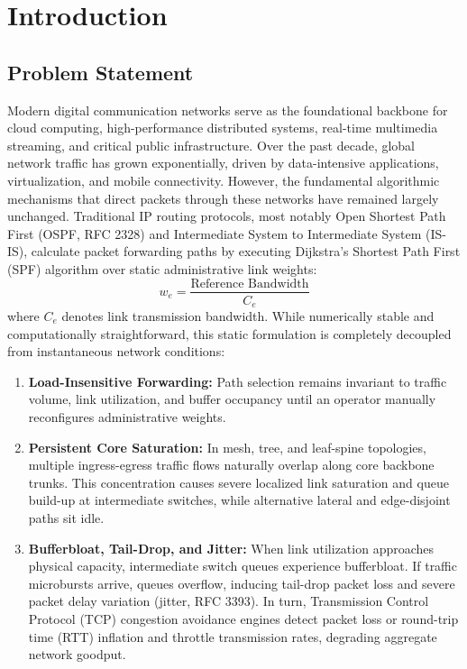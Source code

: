 \documentclass[12pt,a4paper,oneside]{report}
\begin{document}
\chapter{Introduction}
\label{chap:intro}

\section{Problem Statement}
Modern digital communication networks serve as the foundational backbone for cloud computing, high-performance distributed systems, real-time multimedia streaming, and critical public infrastructure. Over the past decade, global network traffic has grown exponentially, driven by data-intensive applications, virtualization, and mobile connectivity. However, the fundamental algorithmic mechanisms that direct packets through these networks have remained largely unchanged. Traditional IP routing protocols, most notably Open Shortest Path First (OSPF, RFC 2328) and Intermediate System to Intermediate System (IS-IS), calculate packet forwarding paths by executing Dijkstra's Shortest Path First (SPF) algorithm over static administrative link weights:
\begin{equation}
w_e = \frac{\text{Reference Bandwidth}}{C_e}
\end{equation}
where $C_e$ denotes link transmission bandwidth. While numerically stable and computationally straightforward, this static formulation is completely decoupled from instantaneous network conditions:
\begin{enumerate}
    \item \textbf{Load-Insensitive Forwarding:} Path selection remains invariant to traffic volume, link utilization, and buffer occupancy until an operator manually reconfigures administrative weights.
    \item \textbf{Persistent Core Saturation:} In mesh, tree, and leaf-spine topologies, multiple ingress-egress traffic flows naturally overlap along core backbone trunks. This concentration causes severe localized link saturation and queue build-up at intermediate switches, while alternative lateral and edge-disjoint paths sit idle.
    \item \textbf{Bufferbloat, Tail-Drop, and Jitter:} When link utilization approaches physical capacity, intermediate switch queues experience bufferbloat. If traffic microbursts arrive, queues overflow, inducing tail-drop packet loss and severe packet delay variation (jitter, RFC 3393). In turn, Transmission Control Protocol (TCP) congestion avoidance engines detect packet loss or round-trip time (RTT) inflation and throttle transmission rates, degrading aggregate network goodput.
\end{enumerate}
\end{document}
